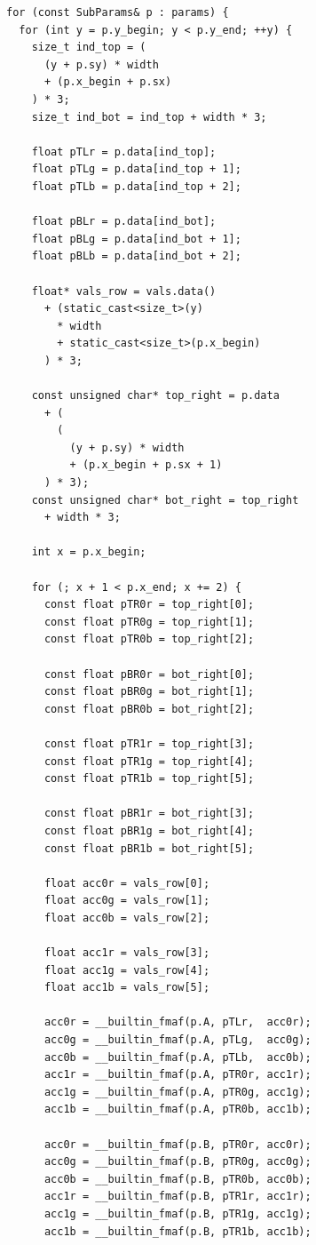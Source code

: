 \documentclass[letterpaper]{article}
\begin{document}
{\fontsize{8}{10}\selectfont
\begin{Verbatim}
for (const SubParams& p : params) {
  for (int y = p.y_begin; y < p.y_end; ++y) {
    size_t ind_top = (
      (y + p.sy) * width
      + (p.x_begin + p.sx)
    ) * 3;
    size_t ind_bot = ind_top + width * 3;

    float pTLr = p.data[ind_top];
    float pTLg = p.data[ind_top + 1];
    float pTLb = p.data[ind_top + 2];

    float pBLr = p.data[ind_bot];
    float pBLg = p.data[ind_bot + 1];
    float pBLb = p.data[ind_bot + 2];

    float* vals_row = vals.data()
      + (static_cast<size_t>(y)
        * width
        + static_cast<size_t>(p.x_begin)
      ) * 3;

    const unsigned char* top_right = p.data
      + (
        (
          (y + p.sy) * width
          + (p.x_begin + p.sx + 1)
      ) * 3);
    const unsigned char* bot_right = top_right
      + width * 3;

    int x = p.x_begin;

    for (; x + 1 < p.x_end; x += 2) {
      const float pTR0r = top_right[0];
      const float pTR0g = top_right[1];
      const float pTR0b = top_right[2];

      const float pBR0r = bot_right[0];
      const float pBR0g = bot_right[1];
      const float pBR0b = bot_right[2];

      const float pTR1r = top_right[3];
      const float pTR1g = top_right[4];
      const float pTR1b = top_right[5];

      const float pBR1r = bot_right[3];
      const float pBR1g = bot_right[4];
      const float pBR1b = bot_right[5];

      float acc0r = vals_row[0];
      float acc0g = vals_row[1];
      float acc0b = vals_row[2];

      float acc1r = vals_row[3];
      float acc1g = vals_row[4];
      float acc1b = vals_row[5];

      acc0r = __builtin_fmaf(p.A, pTLr,  acc0r);
      acc0g = __builtin_fmaf(p.A, pTLg,  acc0g);
      acc0b = __builtin_fmaf(p.A, pTLb,  acc0b);
      acc1r = __builtin_fmaf(p.A, pTR0r, acc1r);
      acc1g = __builtin_fmaf(p.A, pTR0g, acc1g);
      acc1b = __builtin_fmaf(p.A, pTR0b, acc1b);

      acc0r = __builtin_fmaf(p.B, pTR0r, acc0r);
      acc0g = __builtin_fmaf(p.B, pTR0g, acc0g);
      acc0b = __builtin_fmaf(p.B, pTR0b, acc0b);
      acc1r = __builtin_fmaf(p.B, pTR1r, acc1r);
      acc1g = __builtin_fmaf(p.B, pTR1g, acc1g);
      acc1b = __builtin_fmaf(p.B, pTR1b, acc1b);


\end{Verbatim}}
\end{document}
